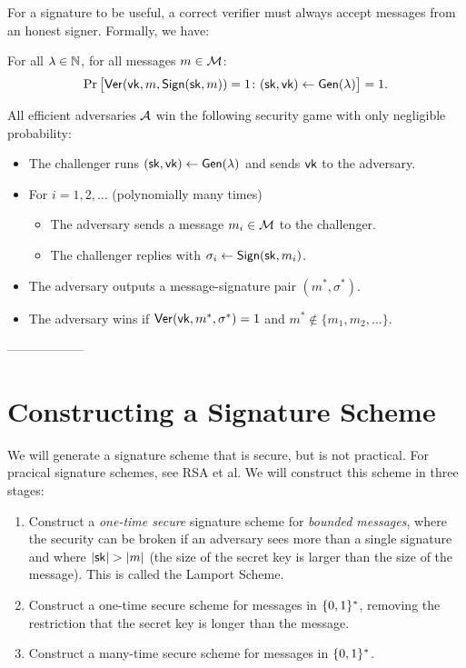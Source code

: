For a signature to be useful, a correct verifier must always accept messages from an
honest signer. Formally, we have:

\begin{definition}
  For all $\lambda \in \mathbb{N}$, for all messages $m \in \mathcal{M}$:
  \[ \Pr\big[\mathsf{Ver}(\mathsf{vk}, m, \mathsf{Sign}({\mathsf{sk}}, m)) = 1 \colon ({\mathsf{sk}}, \mathsf{vk}) \gets \mathsf{Gen}(\lambda) \big] = 1. \]
\end{definition}

\begin{definition}
  All efficient adversaries $\mathcal{A}$ win the following security 
  game with only negligible probability:
  \begin{itemize}[noitemsep]
    \item The challenger runs $({\mathsf{sk}}, \mathsf{vk}) \gets \mathsf{Gen}(\lambda)$ and sends $\mathsf{vk}$ to the adversary.
    \item For $i = 1, 2, \dots$  (polynomially many times)
      \begin{itemize}
        \item The adversary sends a message $m_i \in \mathcal{M}$ to the challenger.
        \item The challenger replies with $\sigma_i \gets \mathsf{Sign}({\mathsf{sk}}, m_i)$.
      \end{itemize}
    \item The adversary outputs a message-signature pair $(m^*, \sigma^*)$.
    \item The adversary wins if $\mathsf{Ver}(\mathsf{vk}, m^*, \sigma^*) = 1$ and $m^* \not \in \{m_1, m_2, \dots\}$.
  \end{itemize}
\end{definition}


------------------


\section{Constructing a Signature Scheme}
We will generate a signature scheme that is secure, but is not practical. For pracical signature schemes, see RSA et al. We will construct this scheme in three stages:

\begin{enumerate}
	\item Construct a \emph{one-time secure} signature scheme for \emph{bounded messages}, where the security can be broken if an adversary sees more than a single signature and where $\left| {\mathsf{sk}} \right| > \left| m \right|$ (the size of the secret key is larger than the size of the message). This is called the Lamport Scheme. %
	\item Construct a one-time secure scheme for messages in $\{0,1\}^*$, removing the restriction that the secret key is longer than the message.
	\item Construct a many-time secure scheme for messages in $\{0,1\}^*$.
\end{enumerate}

